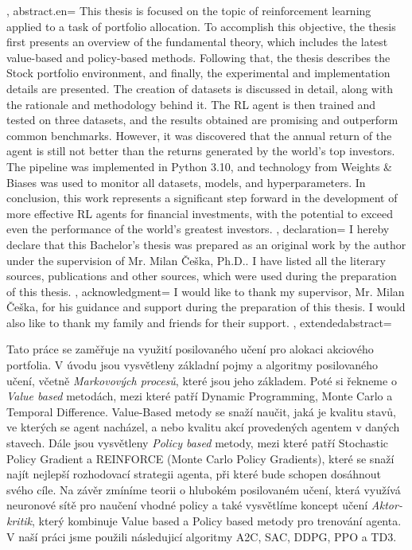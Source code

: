 {{    }, %
    abstract.en={
        This thesis is focused on the topic of reinforcement learning applied to a task of portfolio allocation. To accomplish this objective, the thesis first presents an overview of the fundamental theory, which includes the latest value-based and policy-based methods. Following that, the thesis describes the Stock portfolio environment, and finally, the experimental and implementation details are presented. The creation of datasets is discussed in detail, along with the rationale and methodology behind it. The RL agent is then trained and tested on three datasets, and the results obtained are promising and outperform common benchmarks. However, it was discovered that the annual return of the agent is still not better than the returns generated by the world's top investors. The pipeline was implemented in Python 3.10, and technology from Weights \& Biases was used to monitor all datasets, models, and hyperparameters. In conclusion, this work represents a significant step forward in the development of more effective RL agents for financial investments, with the potential to exceed even the performance of the world's greatest investors.
    }, %
    declaration={
        I hereby declare that this Bachelor's thesis was prepared as an original work by the author under the supervision of Mr. Milan Češka, Ph.D.. I have listed all the literary sources, publications and other sources, which were used during the preparation of this thesis.
    },
%
    acknowledgment={
        I would like to thank my supervisor, Mr. Milan Češka, for his guidance and support during the preparation of this thesis. I would also like to thank my family and friends for their support.
    },
%
    extendedabstract={ %
        Tato práce se zaměřuje na využití posilovaného učení pro alokaci akciového portfolia. V úvodu jsou vysvětleny základní pojmy a algoritmy posilovaného učení, včetně \emph{Markovových procesů}, které jsou jeho základem. Poté si řekneme o \emph{Value based} metodách, mezi které patří Dynamic Programming, Monte Carlo a Temporal Difference. Value-Based metody se snaží naučit, jaká je kvalitu stavů, ve kterých se agent nacházel, a nebo kvalitu akcí provedených agentem v daných stavech. Dále jsou vysvětleny \emph{Policy based} metody, mezi které patří Stochastic Policy Gradient a REINFORCE (Monte Carlo Policy Gradients), které se snaží najít nejlepší rozhodovací strategii agenta, při které bude schopen dosáhnout svého cíle. Na závěr zmíníme teorii o hlubokém posilovaném učení, která využívá neuronové sítě pro naučení vhodné policy a také vysvětlíme koncept učení \emph{Aktor-kritik}, který kombinuje Value based a Policy based metody pro trenování agenta. V naší práci jsme použili následujicí algoritmy A2C, SAC, DDPG, PPO a TD3.

}}

